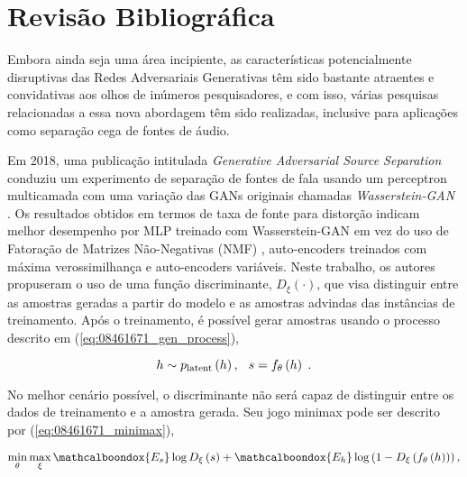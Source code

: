 \section{Revisão Bibliográfica}
\label{sec:gan_for_bss_bib_review}

Embora ainda seja uma área incipiente, as características potencialmente disruptivas das Redes Adversariais Generativas têm sido bastante atraentes e convidativas aos olhos de inúmeros pesquisadores, e com isso, várias pesquisas relacionadas a essa nova abordagem têm sido realizadas, inclusive para aplicações como separação cega de fontes de áudio.

Em 2018, uma publicação intitulada \textit{Generative Adversarial Source Separation} \citep{8461671} conduziu um experimento de separação de fontes de fala usando um perceptron multicamada com uma variação das GANs originais chamadas \textit{Wasserstein-GAN} \citep{arjovsky2017wasserstein}. Os resultados obtidos em termos de taxa de fonte para distorção indicam melhor desempenho por MLP treinado com Wasserstein-GAN em vez do uso de Fatoração de Matrizes Não-Negativas (NMF) \citep{lee1999learning}, auto-encoders treinados com máxima verossimilhança e auto-encoders variáveis. Neste trabalho, os autores propuseram o uso de uma função discriminante, $D_{\xi}\left(\cdot\right)$, que visa distinguir entre as amostras geradas a partir do modelo e as amostras advindas das instâncias de treinamento. Após o treinamento, é possível gerar amostras usando o processo descrito em (\ref{eq:08461671_gen_process}),

\begin{equation}
    h\sim p_{\text{latent}}\left(h\right), \hspace{0.25cm} s = f_{\theta}\left(h\right) \hspace{0.10cm}.
    \label{eq:08461671_gen_process}
    \vspace{0.2cm}
\end{equation}

No melhor cenário possível, o discriminante não será capaz de distinguir entre os dados de treinamento e a amostra gerada. Seu jogo minimax pode ser descrito por (\ref{eq:08461671_minimax}),

\begin{equation}
    \min_{\theta}\max_{\xi}\mathcalboondox{E_{s}}\log D_{\xi}\left(s\right) + \mathcalboondox{E_{h}}\log \left(1-D_{\xi}\left(f_{\theta}\left(h\right)\right)\right),
    \label{eq:08461671_minimax}
    \vspace{0.2cm}
\end{equation}

